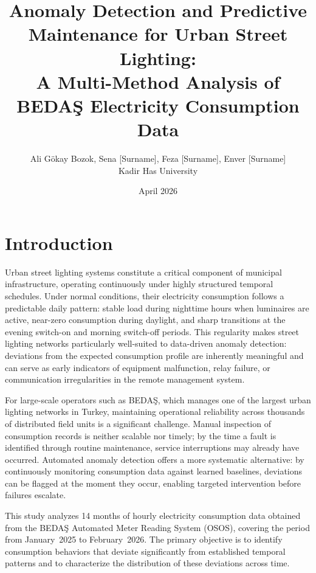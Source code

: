 \documentclass{article}
\title{Anomaly Detection and Predictive Maintenance for Urban Street Lighting: \\
\large A Multi-Method Analysis of BEDAŞ Electricity Consumption Data}
\author{Ali Gökay Bozok, Sena [Surname], Feza [Surname], Enver [Surname] \\
Kadir Has University}
\date{April 2026}
\begin{document}
\maketitle

\section{Introduction}

Urban street lighting systems constitute a critical component of municipal infrastructure, operating continuously under highly structured temporal schedules. Under normal conditions, their electricity consumption follows a predictable daily pattern: stable load during nighttime hours when luminaires are active, near-zero consumption during daylight, and sharp transitions at the evening switch-on and morning switch-off periods. This regularity makes street lighting networks particularly well-suited to data-driven anomaly detection: deviations from the expected consumption profile are inherently meaningful and can serve as early indicators of equipment malfunction, relay failure, or communication irregularities in the remote management system.

For large-scale operators such as BEDA\c{S}, which manages one of the largest urban lighting networks in Turkey, maintaining operational reliability across thousands of distributed field units is a significant challenge. Manual inspection of consumption records is neither scalable nor timely; by the time a fault is identified through routine maintenance, service interruptions may already have occurred. Automated anomaly detection offers a more systematic alternative: by continuously monitoring consumption data against learned baselines, deviations can be flagged at the moment they occur, enabling targeted intervention before failures escalate.

This study analyzes 14 months of hourly electricity consumption data obtained from the BEDA\c{S} Automated Meter Reading System (OSOS), covering the period from January~2025 to February~2026. The primary objective is to identify consumption behaviors that deviate significantly from established temporal patterns and to characterize the distribution of these deviations across time.
\end{document}
